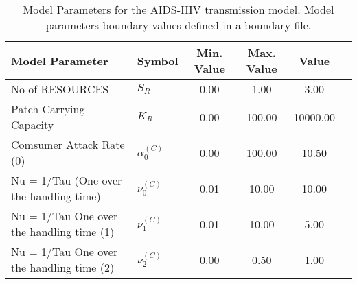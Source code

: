 \begin{table}
\centering
\begin{tabular}{p{5cm}lcccc}
{\bf Model Parameter} & {\bf Symbol} & {\bf Min. Value} & {\bf Max. Value} & {\bf Value}\\
\hline\hline
No of RESOURCES & $S_R$ & 0.00 & 1.00 & 3.00\\
Patch Carrying Capacity & $K_R$ & 0.00 & 100.00 & 10000.00\\
Comsumer Attack Rate (0) & $\alpha^{(C)}_0$ & 0.00 & 100.00 & 10.50\\
Nu = 1/Tau (One over the handling time) & $\nu^{(C)}_0$ & 0.01 & 10.00 & 10.00\\
 Nu = 1/Tau	 One over the handling time (1) & $\nu^{(C)}_1$ & 0.01 & 10.00 & 5.00\\
 Nu = 1/Tau	 One over the handling time (2) & $\nu^{(C)}_2$ & 0.00 & 0.50 & 1.00\\
\hline\hline
\end{tabular}
\caption{Model Parameters for the AIDS-HIV transmission model. Model parameters boundary values defined in a boundary file.}
\end{table}
